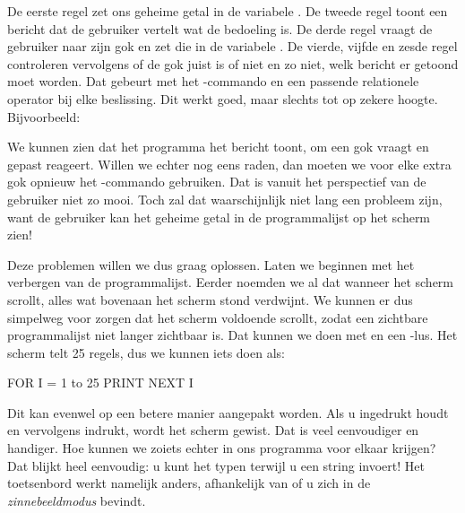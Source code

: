 \needspace{4cm}
De eerste regel zet ons geheime getal in de variabele . De tweede regel toont een bericht dat de gebruiker vertelt wat de bedoeling is. De derde regel vraagt de gebruiker naar zijn gok en zet die in de variabele . De vierde, vijfde en zesde regel controleren vervolgens of de gok juist is of niet en zo niet, welk bericht er getoond moet worden. Dat gebeurt met het -commando en een passende relationele operator bij elke beslissing. Dit werkt goed, maar slechts tot op zekere hoogte. Bijvoorbeeld:


We kunnen zien dat het programma het bericht toont, om een gok vraagt en gepast reageert. Willen we echter nog eens raden, dan moeten we voor elke extra gok opnieuw het -commando gebruiken. Dat is vanuit het perspectief van de gebruiker niet zo mooi. Toch zal dat waarschijnlijk niet lang een probleem zijn, want de gebruiker kan het geheime getal in de programmalijst op het scherm zien!

Deze problemen willen we dus graag oplossen. Laten we beginnen met het verbergen van de programmalijst. Eerder noemden we al dat wanneer het scherm scrollt, alles wat bovenaan het scherm stond verdwijnt. We kunnen er dus simpelweg voor zorgen dat het scherm voldoende scrollt, zodat een zichtbare programmalijst niet langer zichtbaar is. Dat kunnen we doen met  en een -lus. Het scherm telt 25 regels, dus we kunnen iets doen als:

\begin{screencode}
FOR I = 1 to 25
PRINT
NEXT I
\end{screencode}

Dit kan evenwel op een betere manier aangepakt worden. Als u  ingedrukt houdt en vervolgens  indrukt, wordt het scherm gewist. Dat is veel eenvoudiger en handiger. Hoe kunnen we zoiets echter in ons programma voor elkaar krijgen? Dat blijkt heel eenvoudig: u kunt het typen terwijl u een string invoert! Het toetsenbord werkt namelijk anders, afhankelijk van of u zich in de {\em zinnebeeldmodus} bevindt.

